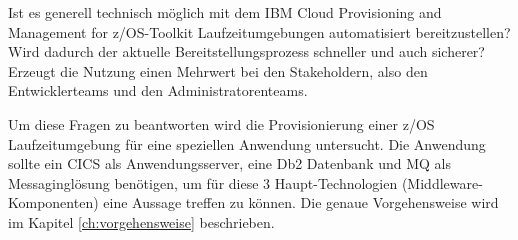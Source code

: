 Ist es generell technisch möglich mit dem \glqq IBM Cloud Provisioning and Management for z/OS\grqq-Toolkit Laufzeitumgebungen automatisiert bereitzustellen?
Wird dadurch der aktuelle Bereitstellungsprozess schneller und auch sicherer?
Erzeugt die Nutzung einen Mehrwert bei den Stakeholdern, also den Entwicklerteams und den Administratorenteams.

Um diese Fragen zu beantworten wird die Provisionierung einer z/OS Laufzeitumgebung für eine speziellen Anwendung untersucht.
Die Anwendung sollte ein CICS als Anwendungsserver, eine Db2 Datenbank und MQ als Messaginglösung benötigen, um für diese 3 Haupt-Technologien (Middleware-Komponenten) eine Aussage treffen zu können.
Die genaue Vorgehensweise wird im Kapitel \ref{ch:vorgehensweise} beschrieben.